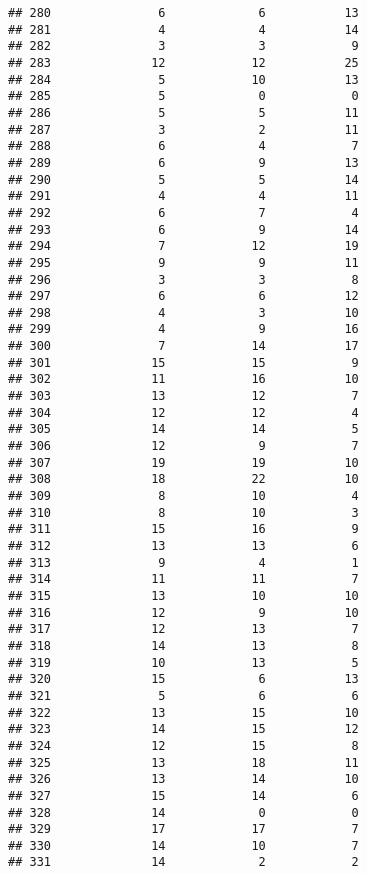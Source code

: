 \documentclass[
]{article}
\begin{document}
\begin{verbatim}
## 280               6             6           13
## 281               4             4           14
## 282               3             3            9
## 283              12            12           25
## 284               5            10           13
## 285               5             0            0
## 286               5             5           11
## 287               3             2           11
## 288               6             4            7
## 289               6             9           13
## 290               5             5           14
## 291               4             4           11
## 292               6             7            4
## 293               6             9           14
## 294               7            12           19
## 295               9             9           11
## 296               3             3            8
## 297               6             6           12
## 298               4             3           10
## 299               4             9           16
## 300               7            14           17
## 301              15            15            9
## 302              11            16           10
## 303              13            12            7
## 304              12            12            4
## 305              14            14            5
## 306              12             9            7
## 307              19            19           10
## 308              18            22           10
## 309               8            10            4
## 310               8            10            3
## 311              15            16            9
## 312              13            13            6
## 313               9             4            1
## 314              11            11            7
## 315              13            10           10
## 316              12             9           10
## 317              12            13            7
## 318              14            13            8
## 319              10            13            5
## 320              15             6           13
## 321               5             6            6
## 322              13            15           10
## 323              14            15           12
## 324              12            15            8
## 325              13            18           11
## 326              13            14           10
## 327              15            14            6
## 328              14             0            0
## 329              17            17            7
## 330              14            10            7
## 331              14             2            2

\end{verbatim}
\end{document}

